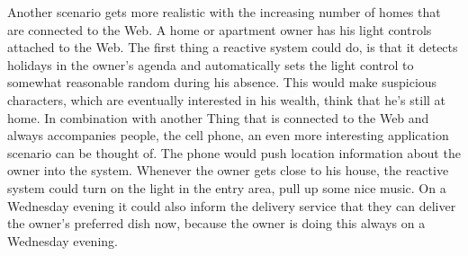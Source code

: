 Another scenario gets more realistic with the increasing number of homes that are connected to the Web.
A home or apartment owner has his light controls attached to the Web.
The first thing a reactive system could do, is that it detects holidays in the owner's agenda and automatically sets the light control to somewhat reasonable random during his absence.
This would make suspicious characters, which are eventually interested in his wealth, think that he's still at home.
In combination with another \textrm{Thing} that is connected to the Web and always accompanies people, the cell phone, an even more interesting application scenario can be thought of.
The phone would push location information about the owner into the system.
Whenever the owner gets close to his house, the reactive system could turn on the light in the entry area, pull up some nice music.
On a Wednesday evening it could also inform the delivery service that they can deliver the owner's preferred dish now, because the owner is doing this always on a Wednesday evening.



